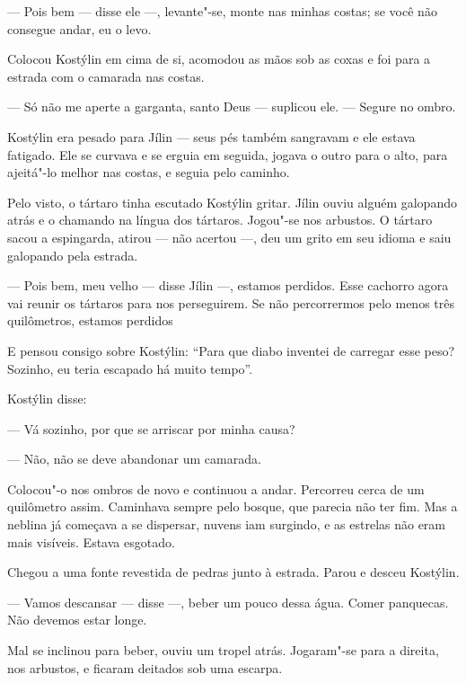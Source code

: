 --- Pois bem --- disse ele ---, levante"-se, monte nas minhas costas; se
você não consegue andar, eu o levo.

Colocou Kostýlin em cima de si, acomodou as mãos sob as coxas e foi para
a estrada com o camarada nas costas.

--- Só não me aperte a garganta, santo Deus --- suplicou ele. --- Segure
no ombro.

Kostýlin era pesado para Jílin --- seus pés também sangravam e ele
estava fatigado. Ele se curvava e se erguia em seguida, jogava o outro
para o alto, para ajeitá"-lo melhor nas costas, e seguia pelo caminho.

Pelo visto, o tártaro tinha escutado Kostýlin gritar. Jílin ouviu alguém
galopando atrás e o chamando na língua dos tártaros. Jogou"-se nos
arbustos. O tártaro sacou a espingarda, atirou --- não acertou ---, deu
um grito em seu idioma e saiu galopando pela estrada.

--- Pois bem, meu velho --- disse Jílin ---, estamos perdidos. Esse
cachorro agora vai reunir os tártaros para nos perseguirem. Se não
percorrermos pelo menos três quilômetros, estamos perdidos

E pensou consigo sobre Kostýlin: ``Para que diabo inventei de carregar
esse peso? Sozinho, eu teria escapado há muito tempo''.

Kostýlin disse:

--- Vá sozinho, por que se arriscar por minha causa?

--- Não, não se deve abandonar um camarada.

Colocou"-o nos ombros de novo e continuou a andar. Percorreu cerca de um
quilômetro assim. Caminhava sempre pelo bosque, que parecia não ter fim.
Mas a neblina já começava a se dispersar, nuvens iam surgindo, e as
estrelas não eram mais visíveis. Estava esgotado.

Chegou a uma fonte revestida de pedras junto à estrada. Parou e desceu
Kostýlin.

--- Vamos descansar --- disse ---, beber um pouco dessa água. Comer
panquecas. Não devemos estar longe.

Mal se inclinou para beber, ouviu um tropel atrás. Jogaram"-se para a
direita, nos arbustos, e ficaram deitados sob uma escarpa.


